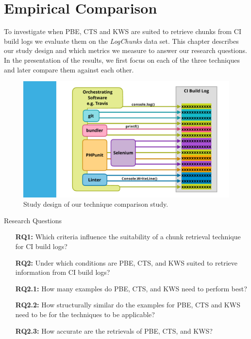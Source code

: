 \documentclass[\myrootdir/main.tex]{subfiles}
\begin{document}
\chapter{Empirical Comparison}
\label{sec:study}
To investigate when PBE, CTS and KWS are suited to retrieve chunks from CI build logs we evaluate them on the \emph{LogChunks} data set.
This chapter describes our study design and which metrics we measure to answer our research questions.
In the presentation of the results, we first focus on each of the three techniques and later compare them against each other.


\begin{figure}[htbp]
	\centering
	\includegraphics[page=2, width=\textwidth, trim={0cm 1cm 1.5cm 0.5cm}, clip]{img/overview-graphics.pdf}
	\caption{Study design of our technique comparison study.}
	\label{fig:study}
\end{figure}


\begin{simplebox}{Research Questions}
\begin{itemize}
  \item[\textbf{RQ1:}] Which criteria influence the suitability of a chunk retrieval technique for CI build logs?
  \item[\textbf{RQ2:}] Under which conditions are PBE, CTS, and KWS suited to retrieve information from CI build logs?
  \item[\textbf{RQ2.1:}] How many examples do PBE, CTS, and KWS need to perform best?
  \item[\textbf{RQ2.2:}] How structurally similar do the examples for PBE, CTS and KWS need to be for the techniques to be applicable?
  \item[\textbf{RQ2.3:}] How accurate are the retrievals of PBE, CTS, and KWS?
\end{itemize}
\end{simplebox}
\end{document}
